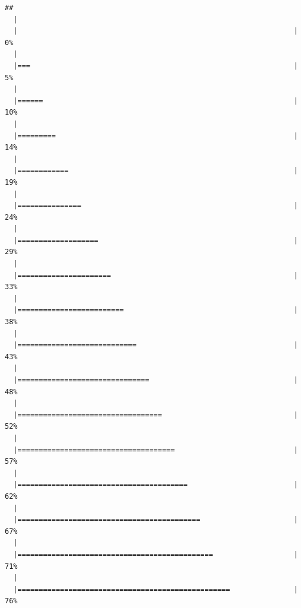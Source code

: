 \documentclass[10pt,A4,]{article}
\begin{document}
\begin{verbatim}
## 
  |                                                                       
  |                                                                 |   0%
  |                                                                       
  |===                                                              |   5%
  |                                                                       
  |======                                                           |  10%
  |                                                                       
  |=========                                                        |  14%
  |                                                                       
  |============                                                     |  19%
  |                                                                       
  |===============                                                  |  24%
  |                                                                       
  |===================                                              |  29%
  |                                                                       
  |======================                                           |  33%
  |                                                                       
  |=========================                                        |  38%
  |                                                                       
  |============================                                     |  43%
  |                                                                       
  |===============================                                  |  48%
  |                                                                       
  |==================================                               |  52%
  |                                                                       
  |=====================================                            |  57%
  |                                                                       
  |========================================                         |  62%
  |                                                                       
  |===========================================                      |  67%
  |                                                                       
  |==============================================                   |  71%
  |                                                                       
  |==================================================               |  76%

\end{verbatim}
\end{document}
